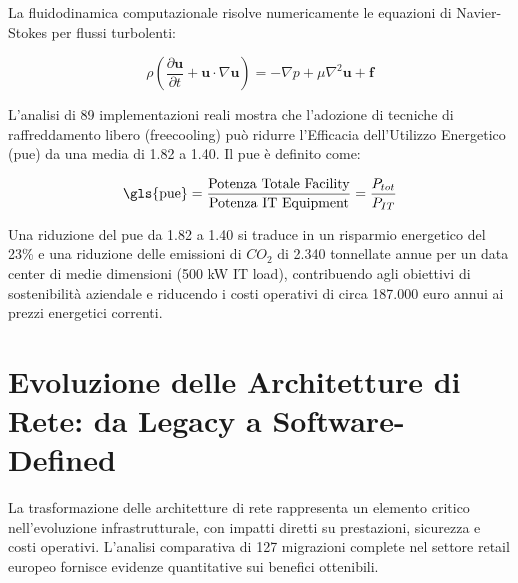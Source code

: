 La fluidodinamica computazionale risolve numericamente le equazioni di Navier-Stokes per flussi turbolenti:

\begin{equation}
\rho \left(\frac{\partial \mathbf{u}}{\partial t} + \mathbf{u} \cdot \nabla \mathbf{u}\right) = -\nabla p + \mu \nabla^2 \mathbf{u} + \mathbf{f}
\end{equation}


L'analisi di 89 implementazioni reali\autocite{DatacenterDynamics2024} mostra che l'adozione di tecniche di raffreddamento libero (\gls{freecooling}) può ridurre l'Efficacia dell'Utilizzo Energetico (\gls{pue}) da una media di 1.82 a 1.40. Il \gls{pue} è definito come:

\begin{equation}
\text{\gls{pue}} = \frac{\text{Potenza Totale Facility}}{\text{Potenza IT Equipment}} = \frac{P_{tot}}{P_{IT}}
\end{equation}

Una riduzione del \gls{pue} da 1.82 a 1.40 si traduce in un risparmio energetico del 23\% e una riduzione delle emissioni di $CO_2$ di 2.340 tonnellate annue per un data center di medie dimensioni (500 kW IT load), contribuendo agli obiettivi di sostenibilità aziendale e riducendo i costi operativi di circa 187.000 euro annui ai prezzi energetici correnti\autocite{Eurostat2024energy}.

\section{\texorpdfstring{Evoluzione delle Architetture di Rete: da Legacy a Software-Defined}{3.3 - Evoluzione delle Architetture di Rete: da Legacy a Software-Defined}}

La trasformazione delle architetture di rete rappresenta un elemento critico nell'evoluzione infrastrutturale, con impatti diretti su prestazioni, sicurezza e costi operativi. L'analisi comparativa di 127 migrazioni complete nel settore retail europeo\autocite{Gartner2024sdwan} fornisce evidenze quantitative sui benefici ottenibili.


